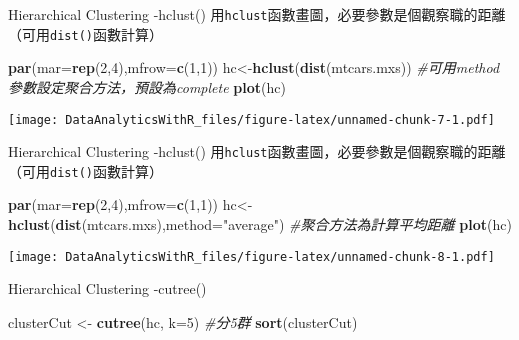 \documentclass[]{book}
\newenvironment{Shaded}{\begin{snugshade}}{\end{snugshade}}
\newcommand{\KeywordTok}[1]{\textcolor[rgb]{0.13,0.29,0.53}{\textbf{{#1}}}}
\newcommand{\DataTypeTok}[1]{\textcolor[rgb]{0.13,0.29,0.53}{{#1}}}
\newcommand{\DecValTok}[1]{\textcolor[rgb]{0.00,0.00,0.81}{{#1}}}
\newcommand{\StringTok}[1]{\textcolor[rgb]{0.31,0.60,0.02}{{#1}}}
\newcommand{\CommentTok}[1]{\textcolor[rgb]{0.56,0.35,0.01}{\textit{{#1}}}}
\newcommand{\NormalTok}[1]{{#1}}
\begin{document}
Hierarchical Clustering -hclust()
用\texttt{hclust}函數畫圖，必要參數是個觀察職的距離（可用\texttt{dist()}函數計算）

\begin{Shaded}
\begin{Highlighting}[]
\KeywordTok{par}\NormalTok{(}\DataTypeTok{mar=}\KeywordTok{rep}\NormalTok{(}\DecValTok{2}\NormalTok{,}\DecValTok{4}\NormalTok{),}\DataTypeTok{mfrow=}\KeywordTok{c}\NormalTok{(}\DecValTok{1}\NormalTok{,}\DecValTok{1}\NormalTok{))}
\NormalTok{hc<-}\KeywordTok{hclust}\NormalTok{(}\KeywordTok{dist}\NormalTok{(mtcars.mxs)) }\CommentTok{#可用method參數設定聚合方法，預設為complete}
\KeywordTok{plot}\NormalTok{(hc)}
\end{Highlighting}
\end{Shaded}

\texttt{[image: DataAnalyticsWithR\_files/figure-latex/unnamed-chunk-7-1.pdf]}

Hierarchical Clustering -hclust()
用\texttt{hclust}函數畫圖，必要參數是個觀察職的距離（可用\texttt{dist()}函數計算）

\begin{Shaded}
\begin{Highlighting}[]
\KeywordTok{par}\NormalTok{(}\DataTypeTok{mar=}\KeywordTok{rep}\NormalTok{(}\DecValTok{2}\NormalTok{,}\DecValTok{4}\NormalTok{),}\DataTypeTok{mfrow=}\KeywordTok{c}\NormalTok{(}\DecValTok{1}\NormalTok{,}\DecValTok{1}\NormalTok{))}
\NormalTok{hc<-}\KeywordTok{hclust}\NormalTok{(}\KeywordTok{dist}\NormalTok{(mtcars.mxs),}\DataTypeTok{method=}\StringTok{"average"}\NormalTok{) }\CommentTok{#聚合方法為計算平均距離}
\KeywordTok{plot}\NormalTok{(hc)}
\end{Highlighting}
\end{Shaded}

\texttt{[image: DataAnalyticsWithR\_files/figure-latex/unnamed-chunk-8-1.pdf]}

Hierarchical Clustering -cutree()

\begin{Shaded}
\begin{Highlighting}[]
\NormalTok{clusterCut <-}\StringTok{ }\KeywordTok{cutree}\NormalTok{(hc, }\DataTypeTok{k=}\DecValTok{5}\NormalTok{) }\CommentTok{#分5群}
\KeywordTok{sort}\NormalTok{(clusterCut)}
\end{Highlighting}
\end{Shaded}
\end{document}
